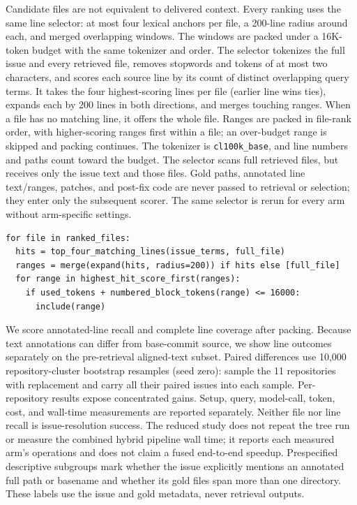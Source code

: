 \documentclass[
]{article}
\begin{document}
Candidate files are not equivalent to delivered context. Every ranking
uses the same line selector: at most four lexical anchors per file, a
200-line radius around each, and merged overlapping windows. The windows
are packed under a 16K-token budget with the same tokenizer and order.
The selector tokenizes the full issue and every retrieved file, removes
stopwords and tokens of at most two characters, and scores each source
line by its count of distinct overlapping query terms. It takes the four
highest-scoring lines per file (earlier line wins ties), expands each
by 200 lines in both directions, and merges touching ranges. When a
file has no matching line, it offers the whole file. Ranges are packed
in file-rank order, with higher-scoring ranges first within a file;
an over-budget range is skipped and packing continues. The tokenizer
is \texttt{cl100k\_base}, and line numbers and paths count toward the
budget. The selector scans full retrieved files, but receives only the
issue text and those files. Gold paths, annotated line text/ranges,
patches, and post-fix code are never passed to retrieval or selection;
they enter only the subsequent scorer. The same selector is rerun for
every arm without arm-specific settings.
\begin{verbatim}
for file in ranked_files:
  hits = top_four_matching_lines(issue_terms, full_file)
  ranges = merge(expand(hits, radius=200)) if hits else [full_file]
  for range in highest_hit_score_first(ranges):
    if used_tokens + numbered_block_tokens(range) <= 16000:
      include(range)
\end{verbatim}
We score annotated-line recall and complete line coverage after packing.
Because text annotations can differ from base-commit source, we show
line outcomes separately on the pre-retrieval aligned-text subset.
Paired differences use 10,000 repository-cluster bootstrap resamples
(seed zero): sample the 11 repositories with replacement and carry all
their paired issues into each sample. Per-repository results expose
concentrated gains. Setup,
query, model-call, token, cost, and wall-time measurements are reported
separately. Neither file nor line recall is issue-resolution success.
The reduced study does not repeat the tree run or measure the combined
hybrid pipeline wall time; it reports each measured arm's operations and
does not claim a fused end-to-end speedup. Prespecified descriptive
subgroups mark whether the issue explicitly mentions an annotated full
path or basename and whether its gold files span more than one
directory. These labels use the issue and gold metadata, never retrieval
outputs.
\end{document}
